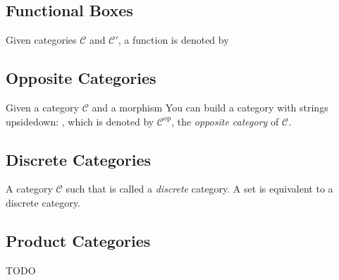 \subsection{Functional Boxes}

Given categories $\mathcal{C}$ and $\mathcal{C}'$, a function
is denoted by


\subsection{Opposite Categories}

Given a category $\mathcal{C}$ and a morphism
You can build a category with strings upsidedown:
, which is denoted by $\mathcal{C}^{\operatorname{op}}$, the \textit{opposite category} of $\mathcal{C}$.

\subsection{Discrete Categories}

A category $\mathcal{C}$ such that
is called a \textit{discrete} category.
A set is equivalent to a discrete category.


\subsection{Product Categories}
TODO 

